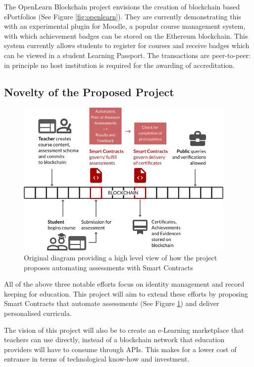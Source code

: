 The OpenLearn Blockchain project envisions the creation of blockchain based ePortfolios (See Figure 
\ref{fig:openlearn}). They are currently demonstrating this with an experimental plugin for Moodle, 
a popular course management system, with which achievement badges can be stored on the Ethereum 
blockchain. This system currently allows students to register for courses and receive badges which 
can be viewed in a student Learning Passport. The transactions are peer-to-peer: in principle no 
host institution is required for the awarding of accreditation. \citep{sharples2016blockchain}

\subsection{Novelty of the Proposed Project}

\begin{figure}[!ht] 
    \centering    
    \includegraphics[width=0.95\textwidth]{moocon}
    \caption[Assessment Smart Contracts Concept]
        {Original diagram providing a high level view of how the project proposes automating assessments 
        with Smart Contracts}
    \label{fig:moocon_assess}
\end{figure}

All of the above three notable efforts focus on identity management and record keeping for education. 
This project will aim to extend these efforts by proposing Smart Contracts that automate assessments 
(See Figure \ref{fig:moocon_assess}) and deliver personalised curricula. 

The vision of this project will also be to create an e-Learning marketplace that teachers can use directly, 
instead of a blockchain network that education providers will have to consume through APIs. This makes for a 
lower cost of entrance in terms of technological know-how and investment.


